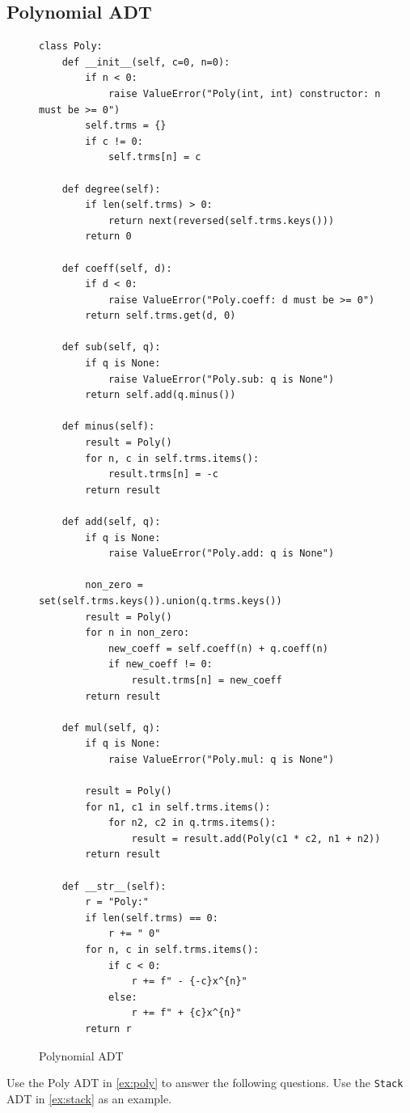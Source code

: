 \documentclass[oneside,11pt,dvipsnames]{book}
\newcommand{\code}[1]{\texttt{#1}}
\begin{document}
\subsection{Polynomial ADT}\label{exercise:poly-adt}
\begin{figure}
\begin{lstlisting}
class Poly:
    def __init__(self, c=0, n=0):
        if n < 0:
            raise ValueError("Poly(int, int) constructor: n must be >= 0")
        self.trms = {}
        if c != 0:
            self.trms[n] = c

    def degree(self):
        if len(self.trms) > 0:
            return next(reversed(self.trms.keys()))
        return 0

    def coeff(self, d):
        if d < 0:
            raise ValueError("Poly.coeff: d must be >= 0")
        return self.trms.get(d, 0)

    def sub(self, q):
        if q is None:
            raise ValueError("Poly.sub: q is None")
        return self.add(q.minus())

    def minus(self):
        result = Poly()
        for n, c in self.trms.items():
            result.trms[n] = -c
        return result

    def add(self, q):
        if q is None:
            raise ValueError("Poly.add: q is None")
        
        non_zero = set(self.trms.keys()).union(q.trms.keys())
        result = Poly()
        for n in non_zero:
            new_coeff = self.coeff(n) + q.coeff(n)
            if new_coeff != 0:
                result.trms[n] = new_coeff
        return result

    def mul(self, q):
        if q is None:
            raise ValueError("Poly.mul: q is None")
        
        result = Poly()
        for n1, c1 in self.trms.items():
            for n2, c2 in q.trms.items():
                result = result.add(Poly(c1 * c2, n1 + n2))
        return result

    def __str__(self):
        r = "Poly:"
        if len(self.trms) == 0:
            r += " 0"
        for n, c in self.trms.items():
            if c < 0:
                r += f" - {-c}x^{n}"
            else:
                r += f" + {c}x^{n}"
        return r
\end{lstlisting}
\caption{Polynomial ADT}\label{ex:poly}
\end{figure}


Use the Poly ADT in \autoref{ex:poly} to answer the following questions. Use the \code{Stack} ADT in \autoref{ex:stack} as an example. 
\end{document}
